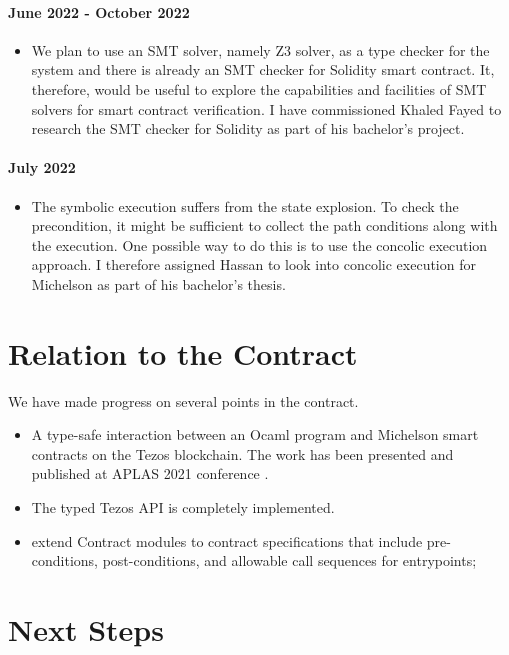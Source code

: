 \documentclass[a4paper,11pt]{article}
\begin{document}
\paragraph{June 2022 - October 2022} 
\begin{itemize}
\item We plan to use an SMT solver, namely Z3  solver, as a type checker for the system and there is already an SMT checker for Solidity smart contract. It, therefore, would be useful to explore the capabilities and facilities of SMT solvers for smart contract verification. I have commissioned Khaled Fayed to research the SMT checker for Solidity as part of his bachelor's project.
\end{itemize}

\paragraph{July 2022}
\begin{itemize}
\item The symbolic execution suffers from the state explosion. To check the precondition, it might be sufficient to collect the path conditions along with the execution. One possible way to do this is to use the concolic execution approach. I therefore assigned Hassan to look into concolic execution for Michelson as part of his bachelor's thesis.
\end{itemize}

\section{Relation to the Contract}
\label{sec:relation-contract}

We have made progress on several points in the contract.
\begin{itemize}
\item A type-safe interaction between an Ocaml program and Michelson smart contracts on the Tezos blockchain. The work has been presented and published at APLAS 2021 conference \cite{DBLP:conf/fc/ThiemannAplas21}. 
\item The typed Tezos API is completely implemented.
\item extend Contract modules to contract specifications that include pre-conditions, post-conditions, and allowable call sequences for entrypoints; 
\end{itemize}


\section{Next Steps}
 
\end{document}

